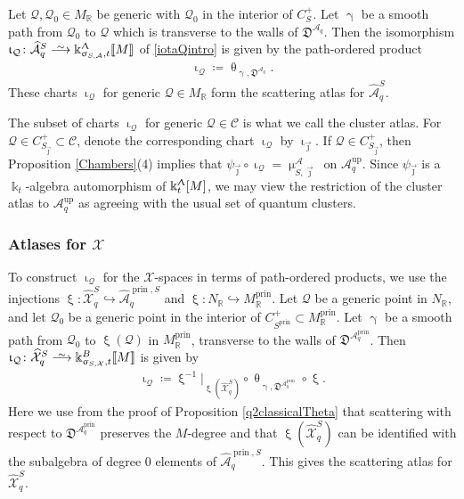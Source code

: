\documentclass{amsart}
\DeclareMathOperator{\prin}{prin}
\DeclareMathOperator{\up}{up}
\let\llb=\llbracket
\let\rrb=\rrbracket
\let\bb=\mathbb
\let\f=\mathfrak
\let\s=\mathcal
\let\wh=\widehat
\def\risom{\buildrel\sim\over{\smashedlongrightarrow}}
\def\smashedlongrightarrow{\setbox0=\hbox{$\longrightarrow$}\ht0=1.25pt\box0}
\newcommand {\kk} {\Bbbk}
\newcommand {\kt} {\kk_t}
\newcommand {\sQ} {\mathcal{Q}}
\newcommand {\jj} {\vec{\jmath}}
\renewcommand{\theta}{\uptheta}
\renewcommand{\iota}{\upiota}
\renewcommand{\gamma}{\upgamma}
\renewcommand{\xi}{\upxi}
\renewcommand{\sigma}{\upsigma}
\renewcommand{\Lambda}{\Uplambda}
\renewcommand{\mu}{\upmu}
\theoremstyle{plain}%
\theoremstyle{definition}
\theoremstyle{remark}
\begin{document}
Let $\sQ,\sQ_0\in M_{\bb{R}}$ be generic with $\sQ_0$ in the interior of $C_S^+$.  Let $\gamma$ be a smooth path from $\sQ_0$ to $\sQ$ which is transverse to the walls of $\f{D}^{\s{A}_q}$.  Then the isomorphism $\iota_{\sQ}\colon \wh{\s{A}}_q^S\risom \kk_{\sigma_{S,\s{A}},t}^{\Lambda}\llb M\rrb$ of \eqref{iotaQintro} is given by the path-ordered product
\begin{align*}
    \iota_{\sQ}\coloneqq \theta_{\gamma,\f{D}^{\s{A}_q}}.
\end{align*}
These charts $\iota_{\sQ}$ for generic $\sQ\in M_{\bb{R}}$ form the scattering atlas for $\wh{\s{A}}^S_q$.

The subset of charts $\iota_{\sQ}$ for generic $\sQ\in \s{C}$ is what we call the cluster atlas.  For $\sQ\in C_{S_{\jj}}^+\subset \s{C}$, denote the corresponding chart $\iota_{\sQ}$ by $\iota_{\jj}$.  If $\sQ\in C_{S_{\jj}}^+$, then Proposition \ref{Chambers}(4) implies that $\psi_{\jj} \circ
\iota_{\sQ}=\mu_{S,\jj}^{\s{A}}$ on $\s{A}_q^{\up}$.  Since $\psi_{\jj}$ is a $\kt$-algebra automorphism of $\kk_t^{\Lambda}[M]$, we may view the restriction of the cluster atlas to $\s{A}_q^{\up}$ as agreeing with the usual set of quantum clusters.

\subsubsection{Atlases for $\s{X}$}\label{AtlasX}
To construct $\iota_{\sQ}$ for the $\s{X}$-spaces in terms of path-ordered products, we use the injections $\xi\colon \wh{\s{X}}_q^S\hookrightarrow \wh{\s{A}}_q^{\prin,S}$ and $\xi\colon N_{\bb{R}}\hookrightarrow M_{\bb{R}}^{\prin}$.  Let $\sQ$ be a generic point in $N_{\bb{R}}$, and let $\sQ_0$ be a generic point in the interior of $C_{S^{\prin}}^+\subset M_{\bb{R}}^{\prin}$.  Let $\gamma$ be a smooth path from $\sQ_0$ to $\xi(\sQ)$ in $M_{\bb{R}}^{\prin}$, transverse to the walls of $\f{D}^{\s{A}_q^{\prin}}$.  Then $\iota_{\sQ}\colon \wh{\s{X}}_q^S\risom \kk_{\sigma_{S,\s{X}},t}^{B}\llb M\rrb$ is given by
\begin{align*}
    \iota_{\sQ}\coloneqq \xi^{-1}|_{\xi(\wh{\s{X}}_q^S)}\circ \theta_{\gamma,\f{D}^{\s{A}_q^{\prin}}}\circ \xi.
\end{align*}
Here we use from the proof of Proposition \ref{q2classicalTheta} that scattering with respect to $\f{D}^{\s{A}_q^{\prin}}$ preserves the $M$-degree and that $\xi(\wh{\s{X}}_q^S)$ can be identified with the subalgebra of degree $0$ elements of $\wh{\s{A}}_q^{\prin,S}$.  This gives the scattering atlas for $\wh{\s{X}}_q^S$.
\end{document}
